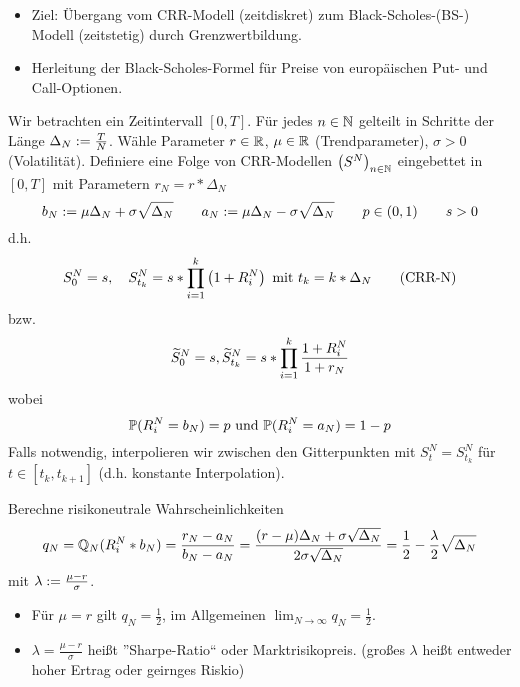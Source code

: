 \begin{itemize}
	\item Ziel: Übergang vom CRR-Modell (zeitdiskret) zum Black-Scholes-(BS-) Modell (zeitstetig) durch Grenzwertbildung.
	\item Herleitung der Black-Scholes-Formel für Preise von europäischen Put- und Call-Optionen.
\end{itemize}

Wir betrachten ein Zeitintervall $[0,T]$. Für jedes $n \in \mathbb{N}$ gelteilt in Schritte der Länge $\Delta_N \mathrel{:=} \frac{T}{N}$. Wähle Parameter $r \in \mathbb{R}$, $\mu \in \mathbb{R}$ (Trendparameter), $\sigma > 0$ (Volatilität).
Definiere eine Folge von CRR-Modellen $\left( S^N \right)_{n \in \mathbb{N}}$ eingebettet in $[0,T]$ mit Parametern $r_N = r * \Delta_N$
\begin{equation*}
b_N \mathrel{:=} \mu \Delta_N + \sigma \sqrt{\Delta_N} \qquad a_N \mathrel{:=} \mu \Delta_N - \sigma \sqrt{\Delta_N} \qquad p \in (0,1) \qquad s > 0
\end{equation*}
d.h. 
\begin{equation*}
S_0^N = s, \quad S_{t_k}^N = s * \prod_{i=1}^{k} \left( 1 + R_i^N \right) \text{ mit } t_k = k * \Delta_N 
\tag{CRR-N}
\label{eq: crrn}
\end{equation*} 
bzw.
\begin{equation*}
\widetilde{S}_0^N = s, \widetilde{S}_{t_k}^N = s * \prod_{i=1}^k \frac{1 + R_i^N}{1 + r_N}
\end{equation*}
wobei
\begin{equation*}
\mathbb{P}(R_i^N = b_N) = p \text{ und } \mathbb{P}(R_i^N = a_N) = 1-p
\end{equation*}
Falls notwendig, interpolieren wir zwischen den Gitterpunkten mit $S_t^N = S_{t_k}^N$ für $t \in [t_k, t_{k+1}]$ (d.h. konstante Interpolation).

Berechne risikoneutrale Wahrscheinlichkeiten
\begin{equation*}
q_N = \mathbb{Q}_N(R_i^N * b_N) = \frac{r_N - a_N}{b_N - a_N} = \frac{(r-\mu) \Delta_N + \sigma \sqrt{\Delta_N}}{2 \sigma \sqrt{\Delta_N}} = \frac{1}{2} - \frac{\lambda}{2} \sqrt{\Delta_N}
\end{equation*}
mit $\lambda \mathrel{:=} \frac{\mu - r}{\sigma}$.

\begin{*bemerkung}
	\begin{itemize}
		\item Für $\mu = r$ gilt $q_N = \frac{1}{2}$, im Allgemeinen $\lim_{N \to \infty} q_N = \frac{1}{2}$.
		\item $\lambda = \frac{\mu - r}{\sigma}$ heißt ''Sharpe-Ratio`` oder Marktrisikopreis. (großes $\lambda$ heißt entweder hoher Ertrag oder geirnges Riskio)
	\end{itemize}
\end{*bemerkung}

